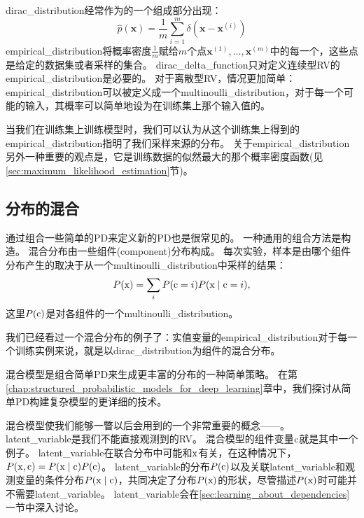 \gls{dirac_distribution}经常作为的一个组成部分出现：
\begin{equation}
\hat{p}(\bm{x}) = \frac{1}{m} \sum_{i=1}^m \delta(\bm{x} - \bm{x}^{(i)})
\end{equation}
\gls{empirical_distribution}将概率密度$\frac{1}{m}$赋给$m$个点$\bm{x}^{(1)}, \ldots, \bm{x}^{(m)}$中的每一个，这些点是给定的数据集或者采样的集合。
\gls{dirac_delta_function}只对定义连续型\gls{RV}的\gls{empirical_distribution}是必要的。
对于离散型\gls{RV}，情况更加简单：\gls{empirical_distribution}可以被定义成一个\gls{multinoulli_distribution}，对于每一个可能的输入，其概率可以简单地设为在训练集上那个输入值的。

当我们在训练集上训练模型时，我们可以认为从这个训练集上得到的\gls{empirical_distribution}指明了我们采样来源的分布。
关于\gls{empirical_distribution}另外一种重要的观点是，它是训练数据的似然最大的那个概率密度函数(见\ref{sec:maximum_likelihood_estimation}节)。

\subsection{分布的混合}
\label{sec:mixtures_of_distributions}

通过组合一些简单的\gls{PD}来定义新的\gls{PD}也是很常见的。
一种通用的组合方法是构造。
混合分布由一些组件(component)分布构成。
每次实验，样本是由哪个组件分布产生的取决于从一个\gls{multinoulli_distribution}中采样的结果：
\begin{equation}
P(\mathrm{x}) = \sum_i P(\mathrm{c} = i) P(\mathrm{x} \mid \mathrm{c} = i),
\end{equation}
这里$P(\mathrm{c})$是对各组件的一个\gls{multinoulli_distribution}。

我们已经看过一个混合分布的例子了：实值变量的\gls{empirical_distribution}对于每一个训练实例来说，就是以\gls{dirac_distribution}为组件的混合分布。


混合模型是组合简单\gls{PD}来生成更丰富的分布的一种简单策略。
在第\ref{chap:structured_probabilistic_models_for_deep_learning}章中，我们探讨从简单\gls{PD}构建复杂模型的更详细的技术。

混合模型使我们能够一瞥以后会用到的一个非常重要的概念——。
\gls{latent_variable}是我们不能直接观测到的\gls{RV}。
混合模型的组件变量$\mathrm{c}$就是其中一个例子。
\gls{latent_variable}在联合分布中可能和$\mathrm{x}$有关，在这种情况下，$P(\mathrm{x}, \mathrm{c}) = P(\mathrm{x} \mid \mathrm{c})P(\mathrm{c})$。
\gls{latent_variable}的分布$P(\mathrm{c})$以及关联\gls{latent_variable}和观测变量的条件分布$P(\mathrm{x} \mid\mathrm{c})$，共同决定了分布$P(\mathrm{x})$的形状，尽管描述$P(\mathrm{x})$时可能并不需要\gls{latent_variable}。
\gls{latent_variable}会在\ref{sec:learning_about_dependencies}一节中深入讨论。

